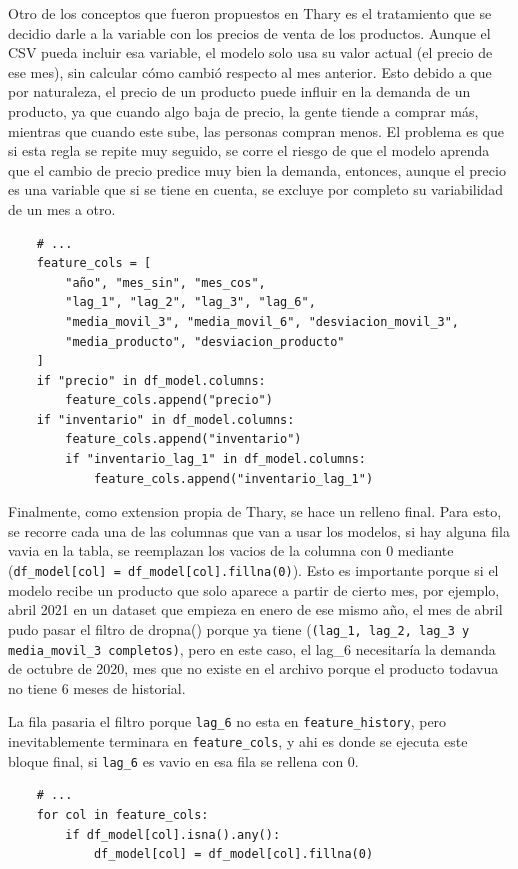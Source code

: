 Otro de los conceptos que fueron propuestos en Thary es el tratamiento que se decidio darle a la variable con los precios de venta de los productos. Aunque el CSV pueda incluir esa variable, el modelo solo usa su valor actual (el precio de ese mes), sin calcular cómo cambió respecto al mes anterior. Esto debido a que por naturaleza, el precio de un producto puede influir en la demanda de un producto, ya que cuando algo baja de precio, la gente tiende a comprar más, mientras que cuando este sube, las personas compran menos. El problema es que si esta regla se repite muy seguido, se corre el riesgo de que el modelo aprenda que el cambio de precio predice muy bien la demanda, entonces, aunque el precio es una variable que si se tiene en cuenta, se excluye por completo su variabilidad de un mes a otro.  

\begin{verbatim}
    # ...
    feature_cols = [
        "año", "mes_sin", "mes_cos",
        "lag_1", "lag_2", "lag_3", "lag_6",
        "media_movil_3", "media_movil_6", "desviacion_movil_3",
        "media_producto", "desviacion_producto"
    ]
    if "precio" in df_model.columns:
        feature_cols.append("precio")
    if "inventario" in df_model.columns:
        feature_cols.append("inventario")
        if "inventario_lag_1" in df_model.columns:
            feature_cols.append("inventario_lag_1")
\end{verbatim}

Finalmente, como extension propia de Thary, se hace un relleno final. Para esto, se recorre cada una de las columnas que van a usar los modelos, si hay alguna fila vavia en la tabla, se reemplazan los vacios de la columna con 0 mediante (\texttt{df\_model[col] = df\_model[col].fillna(0)}). Esto es importante porque si el modelo recibe un producto que solo aparece a partir de cierto mes, por ejemplo, abril 2021 en un dataset que empieza en enero de ese mismo año, el mes de abril pudo pasar el filtro de dropna() porque ya tiene (\texttt{(lag\_1, lag\_2, lag\_3 y media\_movil\_3 completos)}, pero en este caso, el lag\_6 necesitaría la demanda de octubre de 2020, mes que no existe en el archivo porque el producto todavua no tiene 6 meses de historial.

La fila pasaria el filtro porque \texttt{lag\_6} no esta en \texttt{feature\_history}, pero inevitablemente terminara en \texttt{feature\_cols}, y ahi es donde se ejecuta este bloque final, si \texttt{lag\_6} es vavio en esa fila se rellena con 0.

\begin{verbatim}
    # ...
    for col in feature_cols:
        if df_model[col].isna().any():
            df_model[col] = df_model[col].fillna(0)
\end{verbatim}
